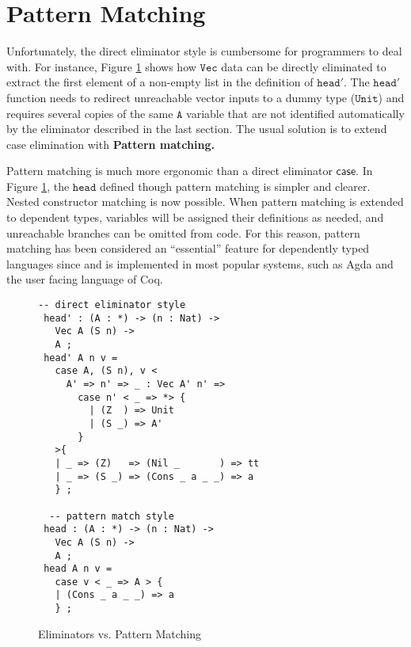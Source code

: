 
\section{Pattern Matching}

Unfortunately, the direct eliminator style is cumbersome for programmers to deal with.
For instance, Figure \ref{fig:data-eliminators} shows how $\mathtt{Vec}$ data can be directly eliminated to extract the first element of a non-empty list in the definition of $\mathtt{head'}$.
The $\mathtt{head'}$ function needs to redirect unreachable vector inputs to a dummy type ($\mathtt{Unit}$) and requires several copies of the same $\mathtt{A}$ variable that are not identified automatically by the eliminator described in the last section.
The usual solution is to extend case elimination with \textbf{Pattern matching.}

Pattern matching is much more ergonomic than a direct eliminator $\mathsf{case}$.
In Figure \ref{fig:data-eliminators}, the $\mathtt{head}$ defined though pattern matching is simpler and clearer.
Nested constructor matching is now possible.
When pattern matching is extended to dependent types, variables will be assigned their definitions as needed, and unreachable branches can be omitted from code.
For this reason, pattern matching has been considered an ``essential'' feature for dependently typed languages since \cite{coquand1992pattern} and is implemented in most popular systems, such as Agda and the user facing language of Coq.


\begin{figure}
\begin{lstlisting}[basicstyle={\ttfamily\small}]
 -- direct eliminator style
 head' : (A : *) -> (n : Nat) ->
   Vec A (S n) ->
   A ;
 head' A n v =
   case A, (S n), v <
     A' => n' => _ : Vec A' n' =>
       case n' < _ => *> {
         | (Z  ) => Unit
         | (S _) => A'
       }
   >{
   | _ => (Z)   => (Nil _       ) => tt
   | _ => (S _) => (Cons _ a _ _) => a
   } ;

  -- pattern match style
 head : (A : *) -> (n : Nat) ->
   Vec A (S n) ->
   A ;
 head A n v =
   case v < _ => A > {
   | (Cons _ a _ _) => a
   } ;
\end{lstlisting}




\caption{Eliminators vs. Pattern Matching}
\label{fig:data-eliminators}
\end{figure}

